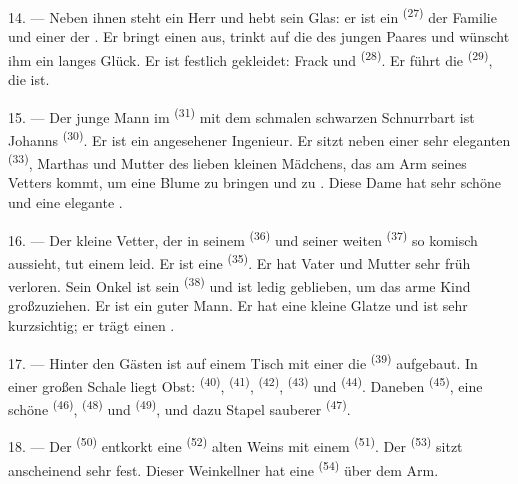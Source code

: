 14. --- Neben ihnen steht ein Herr und hebt sein Glas: er ist ein 
\textsuperscript{(27)} der Familie und einer der .
Er bringt einen  aus, trinkt auf die  des
jungen Paares und wünscht ihm ein langes Glück. Er ist festlich gekleidet: Frack
und  \textsuperscript{(28)}. Er führt die 
\textsuperscript{(29)}, die  ist.

15. --- Der junge Mann im  \textsuperscript{(31)} mit dem schmalen
schwarzen Schnurrbart ist Johanns  \textsuperscript{(30)}. Er ist
ein angesehener Ingenieur. Er sitzt neben einer sehr eleganten  \textsuperscript{(33)}, Marthas  und Mutter des
lieben kleinen Mädchens, das am Arm seines Vetters kommt, um eine Blume zu bringen
und  zu . Diese Dame hat sehr schöne
 und eine elegante .

16. --- Der kleine Vetter, der in seinem  \textsuperscript{(36)} und
seiner weiten  \textsuperscript{(37)} so komisch aussieht, tut einem
leid. Er ist eine  \textsuperscript{(35)}. Er hat Vater und Mutter sehr
früh verloren. Sein Onkel ist sein  \textsuperscript{(38)} und ist
ledig geblieben, um das arme Kind großzuziehen. Er ist ein guter Mann. Er hat eine
kleine Glatze und ist sehr kurzsichtig; er trägt einen .

\VUsaut{2.4mm}
\VUsaut{3.0mm}

17. --- Hinter den Gästen ist auf einem Tisch mit einer  die
 \textsuperscript{(39)} aufgebaut. In einer großen Schale liegt
Obst:  \textsuperscript{(40)}, 
\textsuperscript{(41)},  \textsuperscript{(42)}, 
\textsuperscript{(43)} und  \textsuperscript{(44)}. Daneben
 \textsuperscript{(45)}, eine schöne 
\textsuperscript{(46)},  \textsuperscript{(48)} und
 \textsuperscript{(49)}, und dazu Stapel sauberer
 \textsuperscript{(47)}.

18. --- Der  \textsuperscript{(50)} entkorkt eine 
\textsuperscript{(52)} alten Weins mit einem 
\textsuperscript{(51)}. Der  \textsuperscript{(53)} sitzt anscheinend
sehr fest. Dieser Weinkellner hat eine  \textsuperscript{(54)}
über dem Arm.

